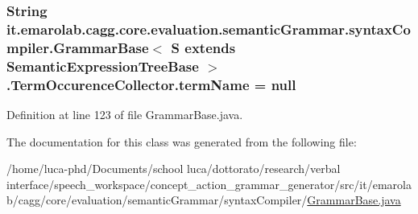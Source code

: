\hypertarget{classit_1_1emarolab_1_1cagg_1_1core_1_1evaluation_1_1semanticGrammar_1_1syntaxCompiler_1_1Gramma8ae8fecdc099d4114647279a9237b701_ae601d480c82b69c459050f017526f259}{
\subsubsection[{term\-Name}]{\setlength{\rightskip}{0pt plus 5cm}String it.\-emarolab.\-cagg.\-core.\-evaluation.\-semantic\-Grammar.\-syntax\-Compiler.\-Grammar\-Base$<$ S extends {\bf Semantic\-Expression\-Tree\-Base} $>$.Term\-Occurence\-Collector.\-term\-Name = null\hspace{0.3cm}{\ttfamily [private]}}}\label{classit_1_1emarolab_1_1cagg_1_1core_1_1evaluation_1_1semanticGrammar_1_1syntaxCompiler_1_1Gramma8ae8fecdc099d4114647279a9237b701_ae601d480c82b69c459050f017526f259}


Definition at line 123 of file Grammar\-Base.\-java.



The documentation for this class was generated from the following file\-:\begin{DoxyCompactItemize}
\item 
/home/luca-\/phd/\-Documents/school luca/dottorato/research/verbal interface/speech\-\_\-workspace/concept\-\_\-action\-\_\-grammar\-\_\-generator/src/it/emarolab/cagg/core/evaluation/semantic\-Grammar/syntax\-Compiler/\hyperlink{GrammarBase_8java}{Grammar\-Base.\-java}\end{DoxyCompactItemize}
